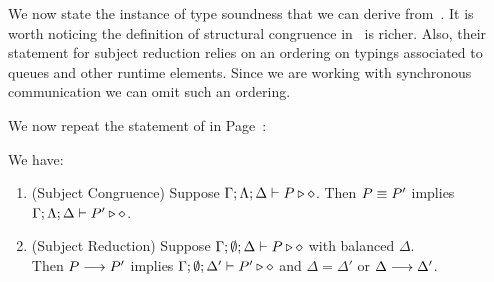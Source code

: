 We now state the instance of type soundness that we
can derive from~\cite{MostrousY15}.
It is worth noticing 
the 
definition of structural congruence in~\cite{MostrousY15} is richer. 
Also, their statement for subject reduction relies on an 
ordering on typings associated to queues and other 
runtime elements. %
Since we are working with synchronous communication we can omit such an ordering.

We now repeat the statement of
 in Page~\pageref{t:sr}:

\begin{theorem}\rm\label{t:srfull}
We have:
	\begin{enumerate}[1.]
		\item	(Subject Congruence) Suppose $\Gamma; \Lambda; \Delta \vdash P \triangleright \diamond$.
			Then $P \equiv P'$ implies $\Gamma; \Lambda; \Delta \vdash P' \triangleright \diamond$.

		\item	(Subject Reduction) Suppose $\Gamma; \emptyset; \Delta \vdash P \triangleright \diamond$
			with
			balanced $\Delta$. \\
			Then $P \longrightarrow P'$ implies $\Gamma; \emptyset; \Delta'  \vdash P' \triangleright \diamond$
			and $\Delta = \Delta'$ or $\Delta \longrightarrow \Delta'$.

	\end{enumerate}
\end{theorem}

